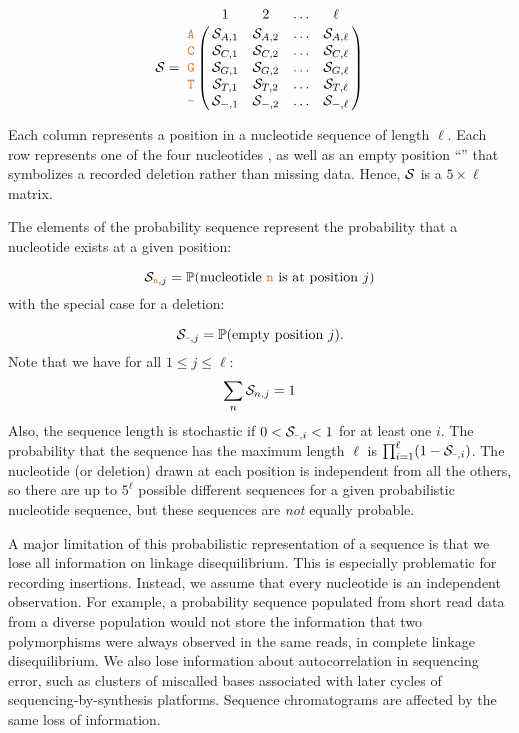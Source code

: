 \documentclass[10pt]{article}
\begin{document}
\begin{equation}
\nps = \bordermatrix{   & 1 & 2 & \ldots & \ell \cr
                \sq{A} & \nps_{A, 1} & \nps_{A, 2} & \ldots & \nps_{A, \ell} \cr
                \sq{C} & \nps_{C, 1} & \nps_{C, 2} & \ldots & \nps_{C, \ell} \cr
                \sq{G} & \nps_{G, 1} & \nps_{G, 2} & \ldots & \nps_{G, \ell} \cr
                \sq{T} & \nps_{T, 1} & \nps_{T, 2} & \ldots & \nps_{T, \ell} \cr 
                \sq{-} & \nps_{-, 1} & \nps_{-, 2} & \ldots & \nps_{-, \ell} \cr 
}\label{eq:nps}
\end{equation}

Each column represents a position in a nucleotide sequence of length $\ell$.
Each row represents one of the four nucleotides , as well as an empty position ``\sq{-}'' that symbolizes a recorded deletion rather than missing data.
Hence, $\mathcal{S}$ is a $5\times\ell$ matrix.



The elements of the probability sequence represent the probability that a nucleotide exists at a given position:

\begin{equation}
\mathcal{S}_{\texttt{\textcolor{brown}{n}},j} = \mathbb{P}(\text{nucleotide \texttt{\textcolor{brown}{n}} is at position }j)
\end{equation}
with the special case for a deletion:

\begin{equation}
\mathcal{S}_{\texttt{\textcolor{brown}{-}},j} = \mathbb{P}(\text{empty position }j).
\end{equation}
Note that we have for all $1\leq j \leq \ell$:
\begin{equation}
\sum_{n} \mathcal{S}_{n, j} = 1
\end{equation}
Also, the sequence length is stochastic if $0<\mathcal{S}_{\texttt{\textcolor{brown}{-}},i}<1$ for at least one $i$.
The probability that the sequence has the maximum length $\ell$ is $\prod_{i=1}^\ell (1-\mathcal{S}_{\texttt{\textcolor{brown}{-}},i})$.
The nucleotide (or deletion) drawn at each position is independent from all the others, so there are up to $5^\ell$ possible different sequences for a given probabilistic nucleotide sequence, but these sequences are \emph{not} equally probable.


A major limitation of this probabilistic representation of a sequence is that we lose all information on linkage disequilibrium.
This is especially problematic for recording insertions.
Instead, we assume that every nucleotide is an independent observation.
For example, a probability sequence populated from short read data from a diverse population would not store the information that two polymorphisms were always observed in the same reads, \ie in complete linkage disequilibrium.
We also lose information about autocorrelation in sequencing error, such as clusters of miscalled bases associated with later cycles of sequencing-by-synthesis platforms.
Sequence chromatograms are affected by the same loss of information.
\end{document}
